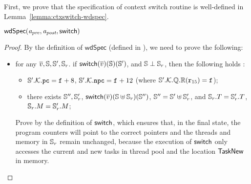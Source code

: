 {First, we prove that the specification of 
context switch routine is well-defined in 
Lemma~\ref{lemma:ctxswitch-wdspec}.
\begin{lemma}
    \em
    \label{lemma:ctxswitch-wdspec}
    $\textsf{wdSpec}({\textit{a}_\textit{pre}}, {\textit{a}_\textit{post}}, {\mathsf{switch}})$
\end{lemma}
\begin{proof}
    By the definition of 
    $\textsf{wdSpec}$ (defined in 
    \Def{\ref{def:well-defined specification}}), 
    we need to prove the following:
    \begin{itemize}
        \item for any $\overline{v}, \mathbb{S}, \mathbb{S}', \mathbb{S}_r$. 
        if $\mathsf{switch}(\overline{v})(\mathbb{S})(\mathbb{S}')$, and 
        $\mathbb{S} \perp \mathbb{S}_r$, 
        then the following holds : 
        \begin{itemize}
            \small
            \item $\mathbb{S}'.\mathcal{K}.\texttt{pc} = \texttt{f}_{} + 8$, 
                $\mathbb{S}'.\mathcal{K}.\texttt{npc} = \texttt{f}_{} + 12$
                (where $\mathbb{S}'.\mathcal{K}.\mathbb{Q}.\mathbb{R}
                    ({\texttt{r}_{15}}) = \texttt{f}_{}$);
            \item there exists $\mathbb{S}'', \mathbb{S}_r'$, 
                $\mathsf{switch}(\overline{v})(\mathbb{S} \uplus \mathbb{S}_r) 
                    (\mathbb{S}'')$, $\mathbb{S}'' = \mathbb{S}' \uplus \mathbb{S}_r'$, 
                and $\mathbb{S}_r.T = \mathbb{S}_r'.T$, 
                $\mathbb{S}_r.M = \mathbb{S}_r'.M$; 
        \end{itemize}

        Prove by the definition of $\mathsf{switch}$, which 
        ensures that, in the final state, 
        the program counters will point to 
        the correct pointers and the threads and 
        memory in $\mathbb{S}_r$ remain unchanged, 
        because the execution of $\mathsf{switch}$ only accesses 
        the current and new tasks in thread pool 
        and the location $\mathsf{TaskNew}$ in memory.



\end{itemize}
\end{proof}}

